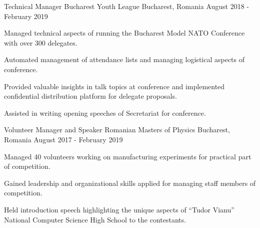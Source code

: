 
\begin{cventries}
  \cventry
    {Technical Manager}
    {Bucharest Youth League}
    {Bucharest, Romania}
    {August 2018 - February 2019}
    {
      \begin{cvitems}
        \item {Managed technical aspects of running the Bucharest Model NATO Conference with over 300 delegates.}
        \item {Automated management of attendance lists and managing logistical aspects of conference.}
        \item {Provided valuable insights in talk topics at conference and implemented confidential distribution platform for delegate proposals.}
        \item {Assisted in writing opening speeches of Secretariat for conference.}
      \end{cvitems}
    }
  \cventry
    {Volunteer Manager and Speaker}
    {Romanian Masters of Physics}
    {Bucharest, Romania}
    {August 2017 - February 2019}
    {
      \begin{cvitems}
        \item {Managed 40 volunteers working on manufacturing experiments for practical part of competition.}
        \item {Gained leadership and organizational skills applied for managing staff members of competition.}
        \item {Held introduction speech highlighting the unique aspects of ``Tudor Vianu'' National Computer Science High School to the contestants.}
      \end{cvitems}
    }
\end{cventries}
